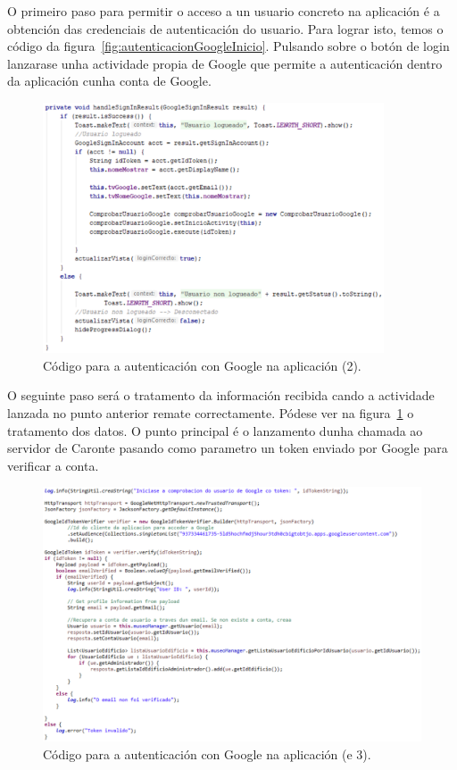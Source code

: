 O primeiro paso para permitir o acceso a un usuario concreto na aplicación é a obtención das credenciais de autenticación do usuario. Para lograr isto, temos o código da figura~\ref{fig:autenticacionGoogleInicio}. Pulsando sobre o botón de login lanzarase unha actividade propia de Google que permite a autenticación dentro da aplicación cunha conta de Google.

\begin{figure}[htb] 
	\begin{center}
		\includegraphics[width=0.9\textwidth]{figures/codigo/autenticacionGoogleRecepcion}
		\caption{Código para a autenticación con Google na aplicación (2).}
		\label{fig:autenticacionGoogleRecepcion}
	\end{center}
\end{figure}

O seguinte paso será o tratamento da información recibida cando a actividade lanzada no punto anterior remate correctamente. Pódese ver na figura~\ref{fig:autenticacionGoogleRecepcion} o tratamento dos datos. O punto principal é o lanzamento dunha chamada ao servidor de Caronte pasando como parametro un token enviado por Google para verificar a conta.

\begin{figure}[htb] 
	\begin{center}
		\includegraphics[width=1\textwidth]{figures/codigo/autenticacionGoogleServidor}
		\caption{Código para a autenticación con Google na aplicación (e 3).}
		\label{fig:autenticacionGoogleServidor}
	\end{center}
\end{figure}

